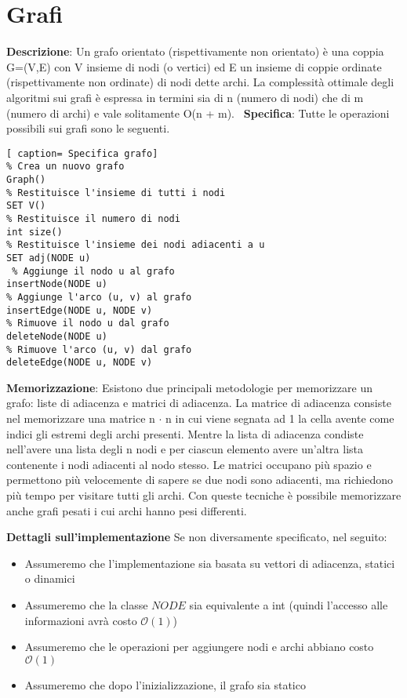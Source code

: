 \documentclass[../cheatSheetAlgoritmi.tex]{subfiles}
\begin{document}
\section{Grafi}
\textbf{Descrizione}: Un grafo orientato (rispettivamente non orientato) è una coppia G=(V,E) con V insieme di nodi (o vertici) ed E un insieme di coppie ordinate (rispettivamente non ordinate) di nodi dette archi. La complessità ottimale degli algoritmi sui grafi è espressa in termini sia di n (numero di nodi) che di m (numero di archi) e vale solitamente O(n + m). \
\textbf{Specifica}: Tutte le operazioni possibili sui grafi sono le seguenti. 
\begin{lstlisting}[ caption= Specifica grafo]
% Crea un nuovo grafo
Graph()
% Restituisce l'insieme di tutti i nodi		
SET V()	
% Restituisce il numero di nodi	
int size()
% Restituisce l'insieme dei nodi adiacenti a u
SET adj(NODE u)
 % Aggiunge il nodo u al grafo
insertNode(NODE u)
% Aggiunge l'arco (u, v) al grafo
insertEdge(NODE u, NODE v)
% Rimuove il nodo u dal grafo
deleteNode(NODE u)	
% Rimuove l'arco (u, v) dal grafo
deleteEdge(NODE u, NODE v)	
\end{lstlisting}
\textbf{Memorizzazione}: Esistono due principali metodologie per memorizzare un grafo: liste di adiacenza e matrici di adiacenza. La matrice di adiacenza consiste nel memorizzare una matrice n $\cdot$ n in cui viene segnata ad 1 la cella avente come indici gli estremi degli archi presenti. Mentre la lista di adiacenza condiste nell'avere una lista degli n nodi e per ciascun elemento avere un'altra lista contenente i nodi adiacenti al nodo stesso. Le matrici occupano più spazio e permettono più velocemente di sapere se due nodi sono adiacenti, ma richiedono più tempo per visitare tutti gli archi. Con queste tecniche è possibile memorizzare anche grafi pesati i cui archi hanno pesi differenti. \

\textbf{Dettagli sull’implementazione}
Se non diversamente specificato, nel seguito:
\begin{itemize}
	\item Assumeremo che l’implementazione sia basata su vettori di adiacenza, statici o dinamici
	\item Assumeremo che la classe $NODE$ sia equivalente a int (quindi l’accesso alle informazioni avrà costo $\mathcal{O}(1)$)
	\item Assumeremo che le operazioni per aggiungere nodi e archi abbiano costo $\mathcal{O}(1)$
	\item Assumeremo che dopo l’inizializzazione, il grafo sia statico
\end{itemize}
\end{document}
